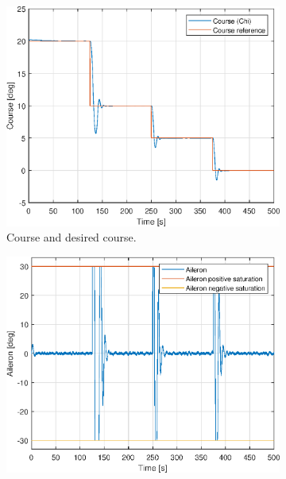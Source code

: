 


\begin{figure}[ht]
	\centering
	\begin{subfigure}[b]{0.45\textwidth}
		\includegraphics[width=\textwidth]{figures/3f/chi_course.eps}
		\caption{Course and desired course. }
		\label{fig:3f_chi_course}
	\end{subfigure}
	\begin{subfigure}[b]{0.45\textwidth}
		\includegraphics[width=\textwidth]{figures/3f/delta_a_aileron.eps}

\end{subfigure}
\end{figure}
